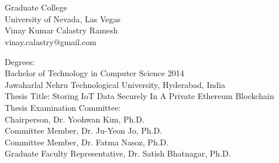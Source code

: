 \documentclass[11pt,openright]{report}
\begin{document}



\vita
\chapter{} %
\linespread{1.3}
\begin{center}
Graduate College\\
University of Nevada, Las Vegas\\[1cm]
Vinay Kumar Calastry Ramesh\\
vinay.calastry@gmail.com\\[1cm]
\end{center}

\noindent Degrees:\\
\indent Bachelor of Technology in Computer Science 2014\\
\indent Jawaharlal Nehru Technological University, Hyderabad, India\\

\noindent Thesis Title: Storing IoT Data Securely In A     
Private Ethereum Blockchain\\

\noindent Thesis Examination Committee:\\
\indent Chairperson, Dr. Yoohwan Kim, Ph.D.\\
\indent Committee Member, Dr. Ju-Yeon Jo, Ph.D.\\
\indent Committee Member, Dr. Fatma Nasoz, Ph.D.\\
\indent Graduate Faculty Representative, Dr. Satish Bhatnagar, Ph.D.\\
\end{document}
